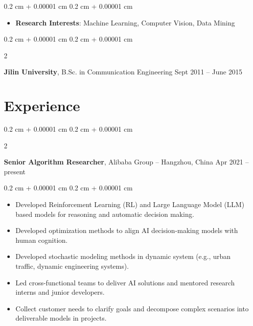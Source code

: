 \documentclass[10pt, letterpaper]{article}
\newenvironment{highlights}{
    \begin{itemize}[
        topsep=0.10 cm,
        parsep=0.10 cm,
        partopsep=0pt,
        itemsep=0pt,
        leftmargin=0.4 cm + 10pt
    ]
}{
    \end{itemize}
} %
\newenvironment{onecolentry}{
    \begin{adjustwidth}{
        0.2 cm + 0.00001 cm
    }{
        0.2 cm + 0.00001 cm
    }
}{
    \end{adjustwidth}
} %
\newenvironment{twocolentry}[2][]{
    \onecolentry
    \def\secondColumn{#2}
    \setcolumnwidth{\fill, 4.5 cm}
    \begin{paracol}{2}
}{
    \switchcolumn \raggedleft \secondColumn
    \end{paracol}
    \endonecolentry
} %
\begin{document}
        \vspace{0.10 cm}
        \begin{onecolentry}
            \begin{highlights}
                \item \textbf{Research Interests}: Machine Learning, Computer Vision, Data Mining
            \end{highlights}
        \end{onecolentry}


        \vspace{0.2 cm}

        \begin{twocolentry}{
            Sept 2011 – June 2015
        }
            \textbf{Jilin University}, B.Sc. in Communication Engineering\end{twocolentry}




    
    \section{Experience}



        
        \begin{twocolentry}{
            Apr 2021 – present
        }
            \textbf{Senior Algorithm Researcher}, Alibaba Group -- Hangzhou, China\end{twocolentry}

        \vspace{0.10 cm}
        \begin{onecolentry}
            \begin{highlights}
                \item Developed Reinforcement Learning (RL) and Large Language Model (LLM) based models for reasoning and automatic decision making.
                \item Developed optimization methods to align AI decision-making models with human cognition.
                \item Developed stochastic modeling methods in dynamic system (e.g., urban traffic, dynamic engineering systems).
                \item Led cross-functional teams to deliver AI solutions and mentored research interns and junior developers.
                \item Collect customer needs to clarify goals and decompose complex scenarios into deliverable models in projects.
            \end{highlights}
        \end{onecolentry}
\end{document}
